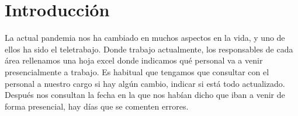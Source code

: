 \documentclass[11pt,spanish,listoffigures,listoftables]{tfgetsinf}
\begin{document}
\pagebreak

\begin{abstract}[english]
Telework Shift Manager is a tool to organize shifts in which the personnel of the different departments of a company takes turns to telework.

For the basic client, a calendar is offered where you can confirm the shifts that are assigned to you or request a change from another colleague.

You also have visibility on the shifts in your area to be able to request the change.

You can also get a copy of the calendar in pdf to print it later or store it.

The department manager can obtain a report with graphs of the people he manages and obtain a list of dates and users working in person.

The application manager has an interface to be able to modify the application settings and obtain a list of dates and users working in person.

The application can be deployed in Google's cloud, so it can be accessed from any location, without the need to invest in dedicated infrastructure.
\end{abstract}


\mainmatter


\chapter{Introducci\'on}
La actual pandemia nos ha cambiado en muchos aspectos en la vida, y uno de ellos ha sido el teletrabajo. Donde trabajo actualmente, los responsables de cada área rellenamos una hoja excel donde indicamos qué personal va a venir presencialmente a trabajo.
Es habitual que tengamos que consultar con el personal a nuestro cargo si hay algún cambio, indicar si está todo actualizado. Después nos consultan la fecha en la que nos habían dicho que iban a venir de forma presencial, hay días que se comenten errores. 
\end{document}

